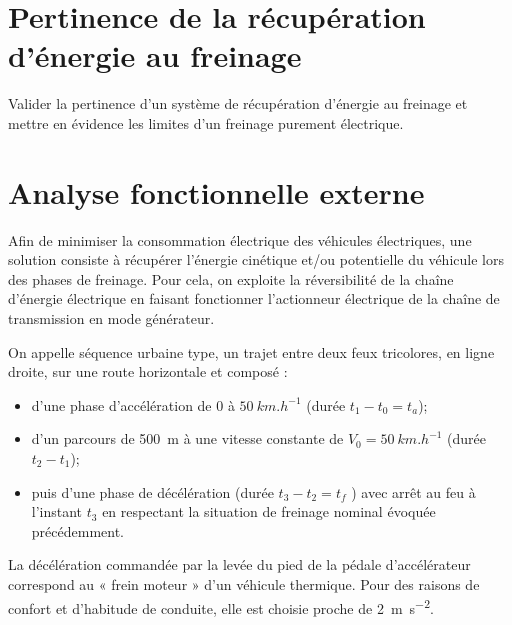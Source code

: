 \documentclass[10pt,fleqn]{article} %
\begin{document}
\begin{multicols}{2}
\section*{Pertinence de la récupération d'énergie au freinage}
\begin{obj}
Valider la pertinence d’un système de récupération d’énergie au freinage et mettre en évidence les
limites d’un freinage purement électrique.
\end{obj}

\section*{Analyse fonctionnelle externe}

Afin de minimiser la consommation électrique des véhicules électriques, une solution consiste à récupérer l’énergie
cinétique et/ou potentielle du véhicule lors des phases de freinage. Pour cela, on exploite la réversibilité de la
chaîne d’énergie électrique en faisant fonctionner l’actionneur électrique de la chaîne de transmission en mode
générateur.


On appelle séquence urbaine type, un trajet entre deux feux tricolores, en ligne droite, sur une route horizontale
et composé :
\begin{itemize}
\item d’une phase d’accélération de 0 à $\SI{50}{km.h^{-1}}$ (durée $t_1 - t_0 = t_a$);
\item d’un parcours de \SI{500}{m} à une vitesse constante de $V_0 =\SI{50}{km.h^{-1}}$ (durée $t_2- t_1$);
\item puis d’une phase de décélération (durée $t_3 -t_2 =t_f$ ) avec arrêt au feu à l’instant $t_3$ en respectant la situation
de freinage nominal évoquée précédemment.
\end{itemize}

La décélération commandée par la levée du pied de la pédale d’accélérateur correspond
au « frein moteur » d’un véhicule thermique. Pour des raisons de confort
et d’habitude de conduite, elle est choisie proche de \SI{2}{m.s^{-2}}. %



\end{multicols}
\end{document}
